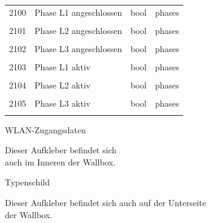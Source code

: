 \documentclass[a4paper,10pt]{article}
\newcommand{\tdesc}[1]{\multicolumn{3}{l}{\footnotesize #1}}
\begin{document}
\begin{tabularx}{\textwidth}{rXll}
2100          & Phase L1 angeschlossen                  & bool         & phases                                                 \\
              & \tdesc{}                                                                                                        \\ \cmidrule{2-4}
2101          & Phase L2 angeschlossen                  & bool         & phases                                                 \\
              & \tdesc{}                                                                                                        \\ \cmidrule{2-4}
2102          & Phase L3 angeschlossen                  & bool         & phases                                                 \\
              & \tdesc{}                                                                                                        \\ \cmidrule{2-4}
2103          & Phase L1 aktiv                          & bool         & phases                                                 \\
              & \tdesc{}                                                                                                        \\ \cmidrule{2-4}
2104          & Phase L2 aktiv                          & bool         & phases                                                 \\
              & \tdesc{}                                                                                                        \\ \cmidrule{2-4}
2105          & Phase L3 aktiv                          & bool         & phases                                                 \\
              & \tdesc{}                                                                                                        \\ \bottomrule
   \end{tabularx}
    \begin{multicols*}{2}




    \newpage
    \pagestyle{empty}
    \null
    \vfill
    WLAN-Zugangsdaten
    \begin{tcolorbox}[width=4.2cm,height=2.7cm, boxrule=0.25mm]

    \end{tcolorbox}
    Dieser Aufkleber befindet sich\\ auch im Inneren der Wallbox.
    \columnbreak

    \null
    \vfill
    Typenschild
    \begin{tcolorbox}[width=7.8cm,height=4.1cm, boxrule=0.25mm]

    \end{tcolorbox}
    Dieser Aufkleber befindet sich auch auf der Unterseite\\ der Wallbox.
\end{multicols*}
\end{document}
